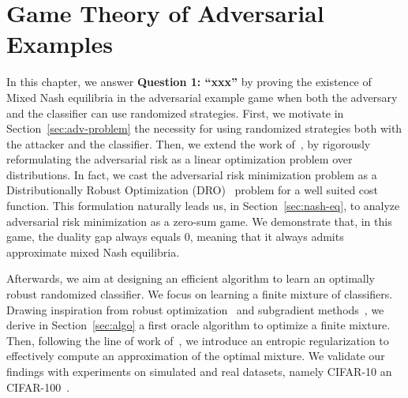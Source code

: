\chapter{Game Theory of Adversarial Examples}
\label{chap:game}
\minitoc

In this chapter, we answer \textbf{Question 1: ``xxx''} by proving the existence of Mixed Nash equilibria in the adversarial example game when both the adversary and the classifier can use randomized strategies. First, we motivate in Section~\ref{sec:adv-problem} the necessity for using randomized strategies both with the attacker and the classifier. Then, we extend the work of~\cite{pydi2019adversarial}, by rigorously reformulating the adversarial risk as a linear optimization problem over distributions. In fact, we cast the adversarial risk minimization problem as a Distributionally Robust Optimization (DRO)~\citep{blanchet2019quantifying} problem for a well suited cost function. This formulation naturally leads us, in Section~\ref{sec:nash-eq}, to analyze adversarial risk minimization as a zero-sum game. We demonstrate that, in this game, the duality gap always equals $0$, meaning that it always admits approximate mixed Nash equilibria.  

Afterwards, we aim at designing an efficient algorithm to learn an optimally robust randomized classifier.
We focus on learning a finite mixture of classifiers. Drawing inspiration from robust optimization~\cite{sinha2017certifying} and subgradient methods~\cite{boyd2003subgradient}, we derive in Section~\ref{sec:algo} a first oracle algorithm to optimize a finite mixture. Then, following the line of work of~\citep{cuturi2013sinkhorn}, we introduce an entropic regularization to effectively compute an approximation of the optimal mixture. We validate our findings with experiments on simulated and real  datasets, namely CIFAR-10 an CIFAR-100~\cite{krizhevsky2009learning}.








